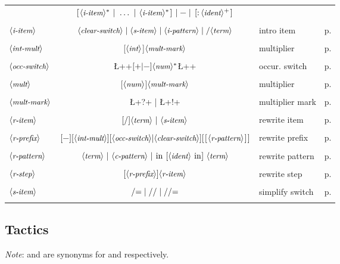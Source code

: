 \begin{longtable}{lclr}
& $ \C{[} \N{i-item}^* \;\C{|}\;\dots\;\C{|}\;\N{i-item}^* \C{]}\;|\;
    \C{-}\;|\;\C{[:} \N{ident}^+\C{]}
 $ &\\
\\
$\langle\mbox{\itshape\rmfamily\small i-item}\rangle$ & $\N{clear-switch} \;|\; \N{s-item} \;|\;
\N{i-pattern} \;|\; \C{/}\N{term}$ & intro item & p. \pageref{ssec:intro}\\
\\
$\langle\mbox{\itshape\rmfamily\small int-mult}\rangle$ & [$\langle\mbox{\itshape\rmfamily\small int}\rangle$]$\langle\mbox{\itshape\rmfamily\small mult-mark}\rangle$ & multiplier &
 p. \pageref{ssec:iter}\\
\\
$\langle\mbox{\itshape\rmfamily\small occ-switch}\rangle$ & \L+{+$[\C{+}|\C{-}]\N{num}^*$\L+}+ &
 occur. switch &  p. \pageref{sssec:occselect}\\
\\
$\langle\mbox{\itshape\rmfamily\small mult}\rangle$ & [$\langle\mbox{\itshape\rmfamily\small num}\rangle$]$\langle\mbox{\itshape\rmfamily\small mult-mark}\rangle$ & multiplier &
 p. \pageref{ssec:iter}\\
\\
$\langle\mbox{\itshape\rmfamily\small mult-mark}\rangle$ &  \L+?+ | \L+!+ & multiplier mark &  p. \pageref{ssec:iter}\\
\\
$\langle\mbox{\itshape\rmfamily\small r-item}\rangle$ &  $[\C{/}]\N{term} \ |\ \N{s-item}$ & rewrite item & p. \pageref{ssec:extrw}\\
\\
$\langle\mbox{\itshape\rmfamily\small r-prefix}\rangle$ & $[\C{-}][\N{int-mult}][\N{occ-switch} |
\N{clear-switch}][\C{[}\N{r-pattern}\C{]}]$ & rewrite prefix & p. \pageref{ssec:extrw}\\
\\
$\langle\mbox{\itshape\rmfamily\small r-pattern}\rangle$ &
   $\N{term}\ |\ \N{c-pattern}\ |\ \C{in}\ [\N{ident}\ \C{in}]\ \N{term} $ &
   rewrite pattern & p. \pageref{ssec:extrw}\\
\\
$\langle\mbox{\itshape\rmfamily\small r-step}\rangle$ & $[\langle\mbox{\itshape\rmfamily\small r-prefix}\rangle]\langle\mbox{\itshape\rmfamily\small r-item}\rangle$ & rewrite step & p. \pageref{ssec:extrw}\\
\\
$\langle\mbox{\itshape\rmfamily\small s-item}\rangle$ & $\C{/=} \;|\; \C{//} \;|\; \C{//=}$ &
simplify switch & p. \pageref{ssec:intro}\\
\\
\end{longtable}


\subsection*{Tactics}
\emph{Note}:  and  are synonyms for  and
 respectively.

